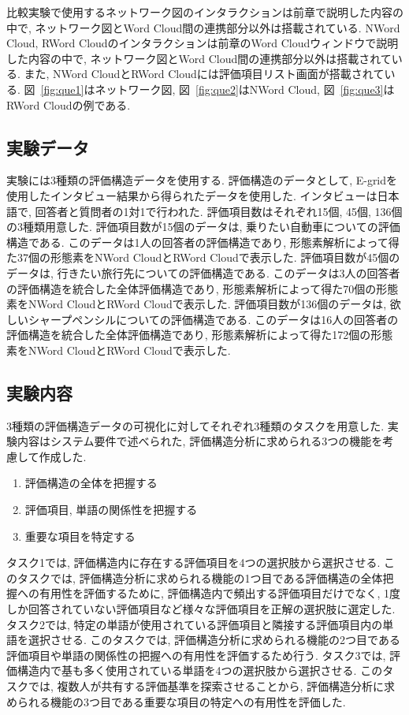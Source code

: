 \documentclass[syuuron]{kuee}
\begin{document}
			比較実験で使用するネットワーク図のインタラクションは前章で説明した内容の中で, 
			ネットワーク図とWord Cloud間の連携部分以外は搭載されている. 
			NWord Cloud, RWord Cloudのインタラクションは前章のWord Cloudウィンドウで説明した内容の中で, 
			ネットワーク図とWord Cloud間の連携部分以外は搭載されている. 
			また, NWord CloudとRWord Cloudには評価項目リスト画面が搭載されている. 
			図~\ref{fig:que1}はネットワーク図, 図~\ref{fig:que2}はNWord Cloud, 
			図~\ref{fig:que3}はRWord Cloudの例である. 
			
		\subsection{実験データ}
			実験には3種類の評価構造データを使用する. 
			評価構造のデータとして, E-gridを使用したインタビュー結果から得られたデータを使用した.
			インタビューは日本語で, 回答者と質問者の1対1で行われた. 
			評価項目数はそれぞれ15個, 45個, 136個の3種類用意した. 
			評価項目数が15個のデータは, 乗りたい自動車についての評価構造である. 
			このデータは1人の回答者の評価構造であり, 形態素解析によって得た37個の形態素をNWord CloudとRWord Cloudで表示した. 
			評価項目数が45個のデータは, 行きたい旅行先についての評価構造である. 
			このデータは3人の回答者の評価構造を統合した全体評価構造であり, 形態素解析によって得た70個の形態素をNWord CloudとRWord Cloudで表示した. 
			評価項目数が136個のデータは, 欲しいシャープペンシルについての評価構造である. 
			このデータは16人の回答者の評価構造を統合した全体評価構造であり, 形態素解析によって得た172個の形態素をNWord CloudとRWord Cloudで表示した. 
		
		\subsection{実験内容}
			3種類の評価構造データの可視化に対してそれぞれ3種類のタスクを用意した. 
			実験内容はシステム要件で述べられた, 評価構造分析に求められる3つの機能を考慮して作成した. 
			\begin{enumerate}
				\item 評価構造の全体を把握する
				\item 評価項目, 単語の関係性を把握する
				\item 重要な項目を特定する
			\end{enumerate}

			タスク1では, 評価構造内に存在する評価項目を4つの選択肢から選択させる. 
			このタスクでは, 評価構造分析に求められる機能の1つ目である評価構造の全体把握への有用性を評価するために, 
			評価構造内で頻出する評価項目だけでなく, 1度しか回答されていない評価項目など様々な評価項目を正解の選択肢に選定した. 
			タスク2では, 特定の単語が使用されている評価項目と隣接する評価項目内の単語を選択させる. 
			このタスクでは, 評価構造分析に求められる機能の2つ目である評価項目や単語の関係性の把握への有用性を評価するため行う. 
			タスク3では, 評価構造内で基も多く使用されている単語を4つの選択肢から選択させる. 
			このタスクでは, 複数人が共有する評価基準を探索させることから, 評価構造分析に求められる機能の3つ目である重要な項目の特定への有用性を評価した. 
			
\end{document}
